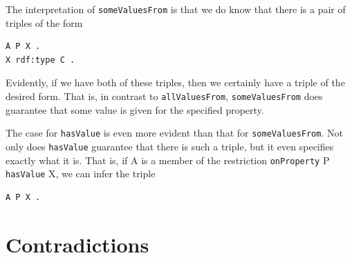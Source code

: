 The interpretation of \texttt{someValuesFrom} is that we do know that there is a
pair of triples of the form

\begin{lstlisting}
A P X .
X rdf:type C .
\end{lstlisting}

Evidently, if we have both of these triples, then we certainly have a
triple of the desired form. That is, in contrast to \texttt{allValuesFrom},
\texttt{someValuesFrom} does guarantee that some value is given for the specified
property.

The case for \texttt{hasValue} is even more evident than that for \texttt{someValuesFrom}.
Not only does \texttt{hasValue} guarantee that there is such a triple, but it
even specifies exactly what it is. That is, if A is a member of the
restriction \texttt{onProperty} P \texttt{hasValue} X, we can infer the triple

\begin{lstlisting}
A P X .
\end{lstlisting}

\section{Contradictions}

